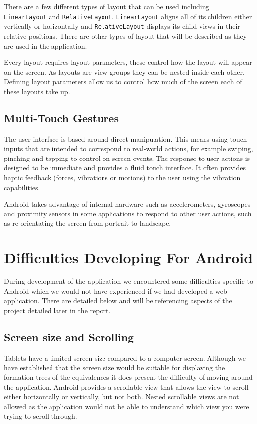 \documentclass{report}
\begin{document}
There are a few different types of layout that can be used including {\tt LinearLayout} and {\tt RelativeLayout}. {\tt LinearLayout} aligns all of its children either vertically or horizontally and {\tt RelativeLayout} displays its child views in their relative positions. There are other types of layout that will be described as they are used in the application.

Every layout requires layout parameters, these control how the layout will appear on the screen. As layouts are view groups they can be nested inside each other. Defining layout parameters allow us to control how much of the screen each of these layouts take up.

\subsection{Multi-Touch Gestures}
\label{sub:gestures}

The user interface is based around direct manipulation. This means using touch inputs that are intended to correspond to real-world actions, for example swiping, pinching and tapping to control on-screen events. The response to user actions is designed to be immediate and provides a fluid touch interface. It often provides haptic feedback (forces, vibrations or motions) to the user using the vibration capabilities.

Android takes advantage of internal hardware such as accelerometers, gyroscopes and proximity sensors in some applications to respond to other user actions, such as re-orientating the screen from portrait to landscape.

\section{Difficulties Developing For Android}

During development of the application we encountered some difficulties specific to Android which we would not have experienced if we had developed a web application. There are detailed below and will be referencing aspects of the project detailed later in the report.

\subsection{Screen size and Scrolling}

Tablets have a limited screen size compared to a computer screen. Although we have established that the screen size would be suitable for displaying the formation trees of the equivalences it does present the difficulty of moving around the application. Android provides a scrollable view that allows the view to scroll either horizontally or vertically, but not both. Nested scrollable views are not allowed as the application would not be able to understand which view you were trying to scroll through.
\end{document}

